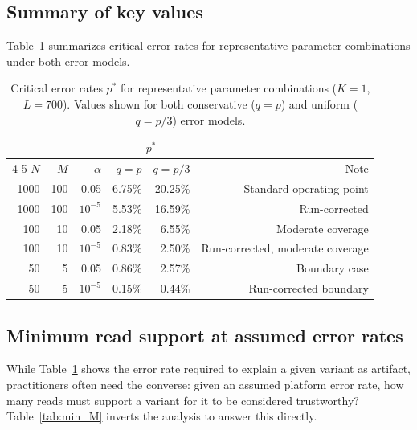\documentclass[11pt]{article}
\begin{document}
\subsection{Summary of key values}

Table~\ref{tab:key_values} summarizes critical error rates for representative
parameter combinations under both error models.

\begin{table}[htbp]
\centering
\caption{Critical error rates $p^*$ for representative parameter combinations
($K = 1$, $L = 700$). Values shown for both conservative ($q = p$) and uniform
($q = p/3$) error models.}
\label{tab:key_values}
\begin{tabular}{rrrrrr}
\toprule
 & & & \multicolumn{2}{c}{$p^*$} & \\
\cmidrule(lr){4-5}
$N$ & $M$ & $\alpha$ & $q = p$ & $q = p/3$ & Note \\
\midrule
1000 & 100 & 0.05     & 6.75\%  & 20.25\% & Standard operating point \\
1000 & 100 & $10^{-5}$ & 5.53\%  & 16.59\% & Run-corrected \\
100  & 10  & 0.05     & 2.18\%  & 6.55\%  & Moderate coverage \\
100  & 10  & $10^{-5}$ & 0.83\%  & 2.50\%  & Run-corrected, moderate coverage \\
50   & 5   & 0.05     & 0.86\%  & 2.57\%  & Boundary case \\
50   & 5   & $10^{-5}$ & 0.15\%  & 0.44\%  & Run-corrected boundary \\
\bottomrule
\end{tabular}
\end{table}

\subsection{Minimum read support at assumed error rates}

While Table~\ref{tab:key_values} shows the error rate required to explain a given
variant as artifact, practitioners often need the converse: given an assumed
platform error rate, how many reads must support a variant for it to be
considered trustworthy? Table~\ref{tab:min_M} inverts the analysis to answer this
directly.
\end{document}
